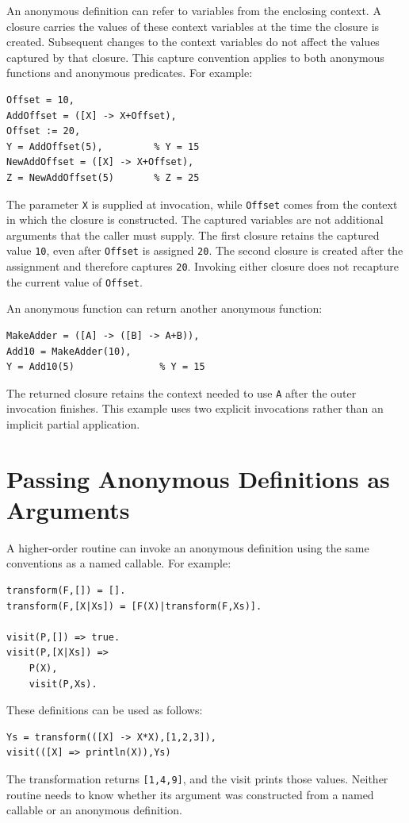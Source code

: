 An anonymous definition can refer to variables from the enclosing context.
A closure carries the values of these context variables at the time the
closure is created. Subsequent changes to the context variables do not affect
the values captured by that closure. This capture convention applies to both
anonymous functions and anonymous predicates. For example:
\begin{verbatim}
Offset = 10,
AddOffset = ([X] -> X+Offset),
Offset := 20,
Y = AddOffset(5),         % Y = 15
NewAddOffset = ([X] -> X+Offset),
Z = NewAddOffset(5)       % Z = 25
\end{verbatim}
The parameter \texttt{X} is supplied at invocation, while \texttt{Offset}
comes from the context in which the closure is constructed. The captured
variables are not additional arguments that the caller must supply.
The first closure retains the captured value \texttt{10}, even after
\texttt{Offset} is assigned \texttt{20}. The second closure is created after
the assignment and therefore captures \texttt{20}. Invoking either closure
does not recapture the current value of \texttt{Offset}.

An anonymous function can return another anonymous function:
\begin{verbatim}
MakeAdder = ([A] -> ([B] -> A+B)),
Add10 = MakeAdder(10),
Y = Add10(5)               % Y = 15
\end{verbatim}
The returned closure retains the context needed to use \texttt{A} after the
outer invocation finishes. This example uses two explicit invocations rather
than an implicit partial application.

\section{Passing Anonymous Definitions as Arguments}
A higher-order routine can invoke an anonymous definition using the same
conventions as a named callable. For example:
\begin{verbatim}
transform(F,[]) = [].
transform(F,[X|Xs]) = [F(X)|transform(F,Xs)].

visit(P,[]) => true.
visit(P,[X|Xs]) =>
    P(X),
    visit(P,Xs).
\end{verbatim}
These definitions can be used as follows:
\begin{verbatim}
Ys = transform(([X] -> X*X),[1,2,3]),
visit(([X] => println(X)),Ys)
\end{verbatim}
The transformation returns \texttt{[1,4,9]}, and the visit prints those values.
Neither routine needs to know whether its argument was constructed from a
named callable or an anonymous definition.

